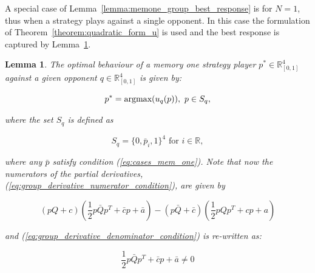 \documentclass[10pt]{article}
\newcommand{\R}{\mathbb{R}}
\newtheorem{lemma}[theorem]{Lemma}
\begin{document}
A special case of Lemma~\ref{lemma:memone_group_best_response} is for \(N=1\),
thus when a strategy plays against a single opponent. In this case the formulation
of Theorem~\ref{theorem:quadratic_form_u} is used and the best response is captured
by Lemma~\ref{lemma:memone_best_response}.

\begin{lemma}\label{lemma:memone_best_response}
    The optimal behaviour of a memory one strategy player \(p^* \in \R_{[0, 1]} ^ 4\)
    against a given opponent \(q \in \R_{[0, 1]} ^ 4\) is given by:

    \[p^* = \textnormal{argmax}(u_q(p)), \ p \in S_q,\]

    where the set \(S_q\) is defined as

    \[S_q = \{0, \bar{p}_i, 1 \}^4 \text{ for } i \in \R,\]

    where any \(\bar{p}\) satisfy condition (\ref{eq:cases_mem_one}). Note that now
    the numerators of the partial derivatives, (\ref{eq:group_derivative_numerator_condition}),
    are given by

    {\small
    \begin{equation}\label{eq:derivative_numerator_condition}
        (pQ + c) ( \frac{1}{2} p  \bar{Q}  p^T + \bar{c}  p + \bar{a})
        - (p\bar{Q} + \bar{c})( \frac{1}{2} p  Q  p^T + c p + a)
    \end{equation}}

    and (\ref{eq:group_derivative_denominator_condition}) is re-written as:

    {\small
    \begin{equation}\label{eq:derivative_denominator_condition}
        \frac{1}{2} p  \bar{Q}  p^T + \bar{c}  p + \bar{a} \neq 0
    \end{equation}}
\end{lemma}
\end{document}
